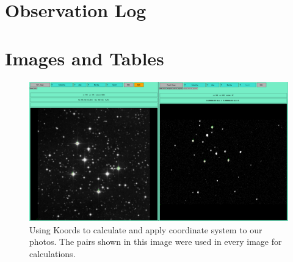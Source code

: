 \documentclass[%
aip,
jmp,
reprint,
floatfix,
nofootinbib
]{revtex4-1}
\begin{document}

	\onecolumngrid
	\appendix
	\section{Observation Log}

	\begin{table}[H]
		\centering
		
		\label{table:log}
	\end{table}	

	\section{Images and Tables} 
	
	\begin{figure}[H]
		\centering
		\includegraphics[width=.8\textwidth]{figs/koords.png}
		\caption{Using Koords to calculate and apply coordinate system to our photos. The pairs shown in this image were used in every image for calculations.}
		\label{fig:koords}
	\end{figure}
	
\end{document}
